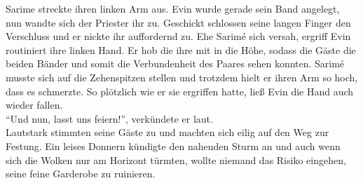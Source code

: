 Sarime streckte ihren linken Arm aus. Evin wurde gerade sein Band angelegt, nun wandte sich der 
Priester ihr zu. Geschickt schlossen seine langen Finger den Verschluss und er nickte ihr 
auffordernd zu. Ehe Sarimé sich versah, ergriff Evin routiniert ihre linken Hand. Er hob die ihre 
mit in die Höhe, sodass die Gäste die beiden Bänder und somit die Verbundenheit des Paares sehen 
konnten. Sarimé musste sich auf die Zehenspitzen stellen und trotzdem hielt er ihren Arm so hoch, 
dass es schmerzte. So plötzlich wie er sie ergriffen hatte, ließ Evin die Hand auch wieder fallen.\\
``Und nun, lasst uns feiern!'', verkündete er laut.\\
Lautstark stimmten seine Gäste zu und machten sich eilig auf den Weg zur Festung. Ein leises 
Donnern kündigte den nahenden Sturm an und auch wenn sich die Wolken nur am Horizont türmten, 
wollte niemand das Risiko eingehen, seine feine Garderobe zu ruinieren.\\

